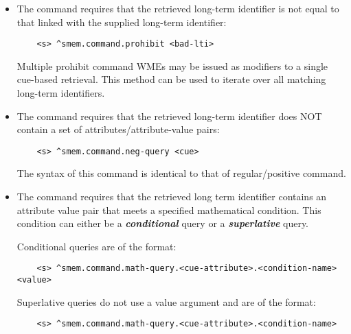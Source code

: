 \begin{itemize}
\item 
	The  command requires that the retrieved long-term identifier is not equal to that linked with the supplied long-term identifier:
	
	\vspace{-6pt}
	\begin{verbatim}
	<s> ^smem.command.prohibit <bad-lti>
	\end{verbatim}
	\vspace{-6pt}
	
	Multiple prohibit command WMEs may be issued as modifiers to a single cue-based retrieval.  
	This method can be used to iterate over all matching long-term identifiers.
\item 
	The  command requires that the retrieved long-term identifier does NOT contain a set of attributes/attribute-value pairs:

	\vspace{-6pt}
	\begin{verbatim}
	<s> ^smem.command.neg-query <cue>
	\end{verbatim}
	\vspace{-6pt}
	
	The syntax of this command is identical to that of regular/positive  command.
\item
	The  command requires that the retrieved long term identifier contains an attribute value pair that meets a specified mathematical condition. 
	This condition can either be a \textit{\textbf{conditional}} query or a \textit{\textbf{superlative}} query. 
	
	Conditional queries are of the format:
	
	\vspace{-6pt}
	\begin{verbatim}
	<s> ^smem.command.math-query.<cue-attribute>.<condition-name> <value>
	\end{verbatim}
	\vspace{-6pt}
	
	Superlative queries do not use a value argument and are of the format:
	
	\vspace{-6pt}
	\begin{verbatim}
	<s> ^smem.command.math-query.<cue-attribute>.<condition-name>
	\end{verbatim}
	\vspace{-6pt}
	

\end{itemize}
